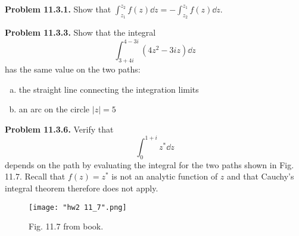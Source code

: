 \documentclass{article}
\begin{document}
\vfill
\hrulefill

\textbf{Problem 11.3.1.} Show that $\displaystyle{\int_{z_1}^{z_2}f(z)\dd z = -\int_{z_2}^{z_1}f(z)\dd z}$.

\vfill
\hrulefill

\textbf{Problem 11.3.3.} Show that the integral
\begin{equation*}
\int_{3+4i}^{4-3i}\left(4z^2 - 3iz\right)\dd z
\end{equation*}
has the same value on the two paths:
\begin{enumerate}[(a)]
    \item the straight line connecting the integration limits
    \item an arc on the circle $|z| = 5$
\end{enumerate}

\newpage
\hrulefill

\textbf{Problem 11.3.6.} Verify that
\begin{equation*}
    \int_0^{1+i} z^*\dd z
\end{equation*}
depends on the path by evaluating the integral for the two paths shown in Fig. 11.7. Recall that $f(z) = z^*$ is not an analytic function of $z$ and that Cauchy's integral theorem therefore does not apply.

\begin{figure}[H]
\centering
\texttt{[image: "hw2 11\_7".png]}
\caption{Fig. 11.7 from book.}
\end{figure}
\end{document}
